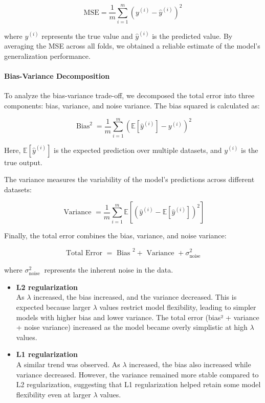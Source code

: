 \documentclass{article}
\begin{document}
$$
\mathrm{MSE}=\frac{1}{m} \sum_{i=1}^m\left(y^{(i)}-\hat{y}^{(i)}\right)^2
$$

where $y^{(i)}$ represents the true value and $\hat{y}^{(i)}$ is the predicted value. By averaging the MSE across all folds, we obtained a reliable estimate of the model's generalization performance.

\paragraph{Bias-Variance Decomposition}
To analyze the bias-variance trade-off, we decomposed the total error into three components: bias, variance, and noise variance. The bias squared is calculated as:

$$
\operatorname{Bias}^2=\frac{1}{m} \sum_{i=1}^m\left(\mathbb{E}\left[\hat{y}^{(i)}\right]-y^{(i)}\right)^2
$$


Here, $\mathbb{E}\left[\hat{y}^{(i)}\right]$ is the expected prediction over multiple datasets, and $y^{(i)}$ is the true output.

The variance measures the variability of the model's predictions across different datasets:

$$
\text { Variance }=\frac{1}{m} \sum_{i=1}^m \mathbb{E}\left[\left(\hat{y}^{(i)}-\mathbb{E}\left[\hat{y}^{(i)}\right]\right)^2\right]
$$


Finally, the total error combines the bias, variance, and noise variance:

$$
\text { Total Error }=\text { Bias }^2+\text { Variance }+\sigma_{\text {noise }}^2
$$

where $\sigma_{\text {noise }}^2$ represents the inherent noise in the data.

\begin{itemize}
    \item \textbf{L2 regularization} \\
    As $\lambda$ increased, the bias increased, and the variance decreased. This is expected because larger $\lambda$ values restrict model flexibility, leading to simpler models with higher bias and lower variance. The total error (bias² + variance + noise variance) increased as the model became overly simplistic at high $\lambda$ values.

    \item \textbf{L1 regularization} \\
    A similar trend was observed. As $\lambda$ increased, the bias also increased while variance decreased. However, the variance remained more stable compared to L2 regularization, suggesting that L1 regularization helped retain some model flexibility even at larger $\lambda$ values.
\end{itemize}
\end{document}
